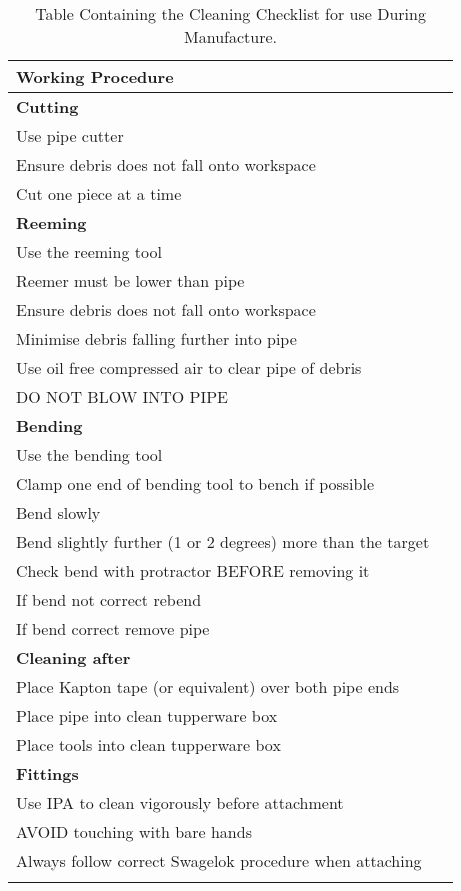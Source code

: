 \begin{longtable}{|m{}|m{}|} \hline
\textbf{Working  Procedure }  &   \\ \hline

\textbf{Cutting}   & \\ \hline
Use  pipe  cutter   &   \\ \hline
Ensure  debris  does  not  fall  onto  workspace    & \\ \hline
Cut  one  piece  at  a  time   &  \\ \hline

\textbf{Reeming}   &    \\ \hline
Use  the  reeming  tool       &   \\ \hline
Reemer  must  be  lower  than  pipe   &    \\ \hline
Ensure  debris  does  not  fall  onto  workspace    &  \\ \hline
Minimise  debris  falling  further  into  pipe     &        \\ \hline
Use  oil  free  compressed  air  to  clear  pipe  of  debris   &  \\ \hline
DO  NOT  BLOW  INTO  PIPE &    \\ \hline

\textbf{Bending}  &    \\ \hline
Use  the  bending  tool    &    \\ \hline
Clamp  one  end  of  bending  tool  to  bench  if  possible   & \\ \hline
Bend  slowly  &   \\ \hline
Bend  slightly  further  (1  or  2  degrees)  more  than  the  target  & \\ \hline
Check  bend  with  protractor  BEFORE  removing  it  &  \\ \hline
If  bend  not  correct  rebend   &  \\ \hline
If  bend  correct  remove  pipe  &     \\ \hline

\textbf{Cleaning  after}  &  \\ \hline
Place  Kapton  tape  (or  equivalent)  over  both  pipe  ends & \\ \hline
Place  pipe  into  clean  tupperware  box  & \\ \hline
Place  tools  into  clean  tupperware  box   &   \\ \hline
 
\textbf{Fittings} &    \\ \hline
Use  IPA  to  clean  vigorously  before  attachment &  \\ \hline
AVOID  touching  with  bare  hands  &   \\ \hline
Always  follow  correct  Swagelok  procedure  when  attaching    & \\ \hline     
\caption{Table Containing the Cleaning Checklist for use During Manufacture.}
\label{tab:appcleancheck}
\end{longtable}